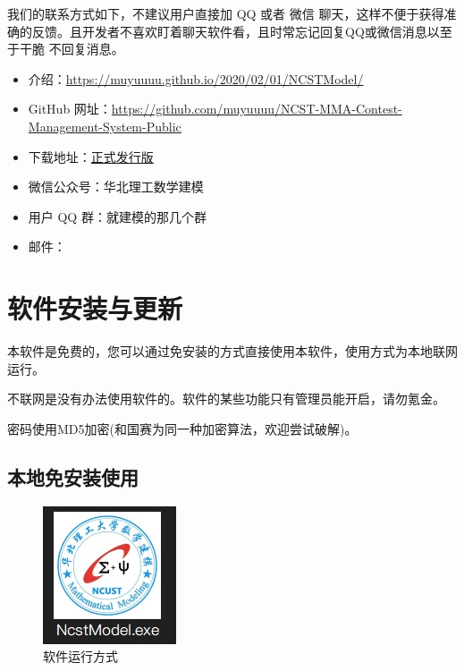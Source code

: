 \documentclass[cn, 11pt, chinese, show]{elegantbook}
\begin{document}
我们的联系方式如下，不建议用户直接加 QQ 或者 微信 聊天，这样不便于获得准确的反馈。且开发者不喜欢盯着聊天软件看，且时常忘记回复QQ或微信消息以至于干脆
不回复消息。
\begin{itemize}
  \item 介绍：\href{https://muyuuuu.github.io/2020/02/01/NCSTModel/}{https://muyuuuu.github.io/2020/02/01/NCSTModel/}
  \item GitHub 网址：\href{https://github.com/muyuuuu/NCST-MMA-Contest-Management-System-Public}{https://github.com/muyuuuu/NCST-MMA-Contest-Management-System-Public}
  \item 下载地址：\href{https://github.com/muyuuuu/NCST-MMA-Contest-Management-System-Public/releases}{正式发行版}
  \item 微信公众号：华北理工数学建模
  \item 用户 QQ 群：就建模的那几个群
  \item 邮件：
\end{itemize}

\section{软件安装与更新}

本软件是免费的，您可以通过免安装的方式直接使用本软件，使用方式为本地联网运行。

\begin{remark}
不联网是没有办法使用软件的。软件的某些功能只有管理员能开启，请勿氪金。
\end{remark}

\begin{remark}
密码使用MD5加密(和国赛为同一种加密算法，欢迎尝试破解)。
\end{remark}

\subsection{本地免安装使用}

\begin{figure}[h]
    \centering
    \includegraphics{figure/1.png}
    \caption{软件运行方式}
    \label{fig:exe}
\end{figure}
\end{document}
